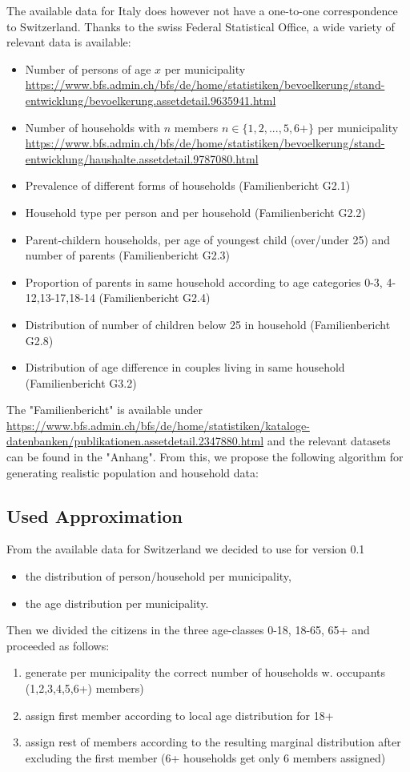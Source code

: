 \documentclass[]{scrartcl}
\begin{document}
The available data for Italy does however not have a one-to-one  correspondence to Switzerland. 
Thanks to the swiss Federal Statistical Office, a wide variety of relevant data is available:
\begin{itemize}
	\item Number of persons of age $x$ per municipality
	\\ \url{https://www.bfs.admin.ch/bfs/de/home/statistiken/bevoelkerung/stand-entwicklung/bevoelkerung.assetdetail.9635941.html}
	\item Number of households with $n$ members $n\in \{1,2,...,5,6+\}$ per municipality\\ \url{https://www.bfs.admin.ch/bfs/de/home/statistiken/bevoelkerung/stand-entwicklung/haushalte.assetdetail.9787080.html}
	\item Prevalence of different forms of households (Familienbericht G2.1)
	\item Household type per person and per household (Familienbericht G2.2)
	\item Parent-childern households, per age of youngest child (over/under 25) and number of parents (Familienbericht G2.3)
	\item Proportion of parents in same household according to age categories 0-3, 4-12,13-17,18-14 (Familienbericht G2.4)
	\item Distribution of number of children below 25 in household (Familienbericht G2.8)
	\item Distribution of age difference in couples living in same household (Familienbericht G3.2)
\end{itemize}
The "Familienbericht" is available under \url{https://www.bfs.admin.ch/bfs/de/home/statistiken/kataloge-datenbanken/publikationen.assetdetail.2347880.html} and the relevant datasets can be found in the "Anhang".
From this, we propose the following algorithm for generating realistic population and household data:


\subsection{Used Approximation}
From the available data for Switzerland we decided to use for version 0.1
\begin{itemize}
	\item the distribution of person/household per municipality,
	\item the age distribution per municipality.
\end{itemize}
Then we divided the citizens in the three age-classes 0-18, 18-65, 65+ and proceeded as follows:
\begin{enumerate}
	\item generate per municipality the correct number of households w. occupants 
		(1,2,3,4,5,6+) members)
	\item assign first member according to local age distribution for 18+
	\item assign rest of members according to the resulting marginal distribution after excluding the first member
	(6+ households get only 6 members assigned)
\end{enumerate}
	
\end{document}
